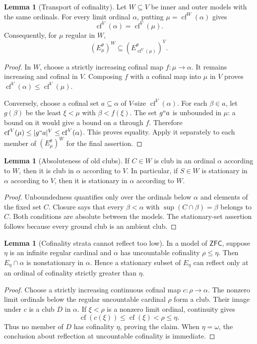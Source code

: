 \documentclass[11pt,letterpaper]{article}
\theoremstyle{definition}
\newtheorem{lemma}[definition]{Lemma}
\numberwithin{equation}{section}
\newcommand{\ZFC}{\mathsf{ZFC}}
\newcommand{\cf}{\operatorname{cf}}
\begin{document}
\begin{lemma}[Transport of cofinality]\label{lem:transport}
Let $W\subseteq V$ be inner and outer models with the same ordinals. For every limit ordinal $\alpha$, putting $\mu=\cf^W(\alpha)$ gives
\[
\cf^V(\alpha)=\cf^V(\mu).
\]
Consequently, for $\mu$ regular in $W$,
\[
(E^\theta_\mu)^W\subseteq(E^\theta_{\cf^V(\mu)})^V.
\]
\end{lemma}
\begin{proof}
In $W$, choose a strictly increasing cofinal map $f:\mu\to\alpha$. It remains increasing and cofinal in $V$. Composing $f$ with a cofinal map into $\mu$ in $V$ proves
$\cf^V(\alpha)\le\cf^V(\mu)$.

Conversely, choose a cofinal set $a\subseteq\alpha$ of $V$-size $\cf^V(\alpha)$. For each $\beta\in a$, let $g(\beta)$ be the least $\xi<\mu$ with $\beta<f(\xi)$. The set $g``a$ is unbounded in $\mu$: a bound on it would give a bound on $a$ through $f$. Therefore
$\cf^V(\mu)\le |g``a|^V\le\cf^V(\alpha)$.
This proves equality. Apply it separately to each member of $(E^\theta_\mu)^W$ for the final assertion.
\end{proof}

\begin{lemma}[Absoluteness of old clubs]\label{lem:clubs}
If $C\in W$ is club in an ordinal $\alpha$ according to $W$, then it is club in $\alpha$ according to $V$. In particular, if $S\in W$ is stationary in $\alpha$ according to $V$, then it is stationary in $\alpha$ according to $W$.
\end{lemma}
\begin{proof}
Unboundedness quantifies only over the ordinals below $\alpha$ and elements of the fixed set $C$. Closure says that every $\beta<\alpha$ with $\sup(C\cap\beta)=\beta$ belongs to $C$. Both conditions are absolute between the models. The stationary-set assertion follows because every ground club is an ambient club.
\end{proof}

\begin{lemma}[Cofinality strata cannot reflect too low]\label{lem:nonreflection}
In a model of $\ZFC$, suppose $\eta$ is an infinite regular cardinal and $\alpha$ has uncountable cofinality $\rho\le\eta$. Then $E_\eta\cap\alpha$ is nonstationary in $\alpha$. Hence a stationary subset of $E_\eta$ can reflect only at an ordinal of cofinality strictly greater than $\eta$.
\end{lemma}
\begin{proof}
Choose a strictly increasing continuous cofinal map $c:\rho\to\alpha$. The nonzero limit ordinals below the regular uncountable cardinal $\rho$ form a club. Their image under $c$ is a club $D$ in $\alpha$. If $\xi<\rho$ is a nonzero limit ordinal, continuity gives
\[
\cf(c(\xi))\le\cf(\xi)<\rho\le\eta.
\]
Thus no member of $D$ has cofinality $\eta$, proving the claim. When $\eta=\omega$, the conclusion about reflection at uncountable cofinality is immediate.
\end{proof}
\end{document}
